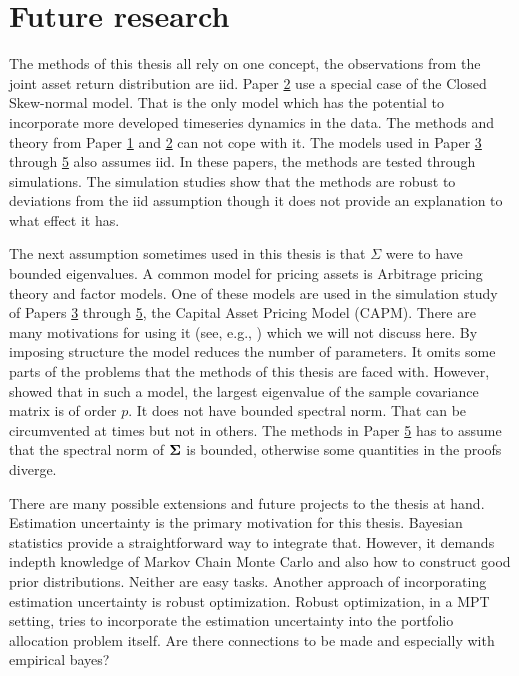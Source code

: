 \documentclass[12pt, oneside]{book}\usepackage{knitr}
\begin{document}
{%
\chapter{Future research}\label{ch:future}


The methods of this thesis all rely on one concept, the observations from the joint asset return distribution are iid.
Paper \hyperref[sec:paper2]{2} use a special case of the Closed Skew-normal model.
That is the only model which has the potential to incorporate more developed timeseries dynamics in the data.
The methods and theory from Paper \hyperref[sec:paper1]{1} and \hyperref[sec:paper2]{2} can not cope with it.
The models used in Paper \hyperref[sec:paper3]{3} through \hyperref[sec:paper5]{5} also assumes iid.
In these papers, the methods are tested through simulations.
The simulation studies show that the methods are robust to deviations from the iid assumption though it does not provide an explanation to what effect it has.

The next assumption sometimes used in this thesis is that $\Sigma$ were to have bounded eigenvalues.
A common model for pricing assets is Arbitrage pricing theory and factor models. 
One of these models are used in the simulation study of Papers \hyperref[sec:paper3]{3} through \hyperref[sec:paper5]{5}, the Capital Asset Pricing Model (CAPM).
There are many motivations for using it (see, e.g., \citet{ross2013arbitrage}) which we will not discuss here.
By imposing structure the model reduces the number of parameters.
It omits some parts of the problems that the methods of this thesis are faced with.
However, \citet{} showed that in such a model, the largest eigenvalue of the sample covariance matrix is of order $p$.
It does not have bounded spectral norm.
That can be circumvented at times but not in others.
The methods in Paper \hyperref[sec:paper5]{5} has to assume that the spectral norm of $\mathbf{\Sigma}$ is bounded, otherwise some quantities in the proofs diverge.

There are many possible extensions and future projects to the thesis at hand.
Estimation uncertainty is the primary motivation for this thesis.
Bayesian statistics provide a straightforward way to integrate that. 
However, it demands indepth knowledge of Markov Chain Monte Carlo and also how to construct good prior distributions.
Neither are easy tasks.
Another approach of incorporating estimation uncertainty is robust optimization.
Robust optimization, in a MPT setting, tries to incorporate the estimation uncertainty into the portfolio allocation problem itself.
Are there connections to be made and especially with empirical bayes?

}
\end{document}
